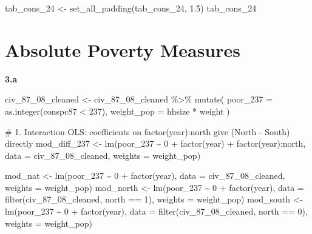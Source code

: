 \documentclass[
  letterpaper,
  DIV=11,
  numbers=noendperiod]{scrartcl}
\newenvironment{Shaded}{\begin{snugshade}}{\end{snugshade}}
\newcommand{\AttributeTok}[1]{\textcolor[rgb]{0.40,0.45,0.13}{#1}}
\newcommand{\CommentTok}[1]{\textcolor[rgb]{0.37,0.37,0.37}{#1}}
\newcommand{\DecValTok}[1]{\textcolor[rgb]{0.68,0.00,0.00}{#1}}
\newcommand{\FloatTok}[1]{\textcolor[rgb]{0.68,0.00,0.00}{#1}}
\newcommand{\FunctionTok}[1]{\textcolor[rgb]{0.28,0.35,0.67}{#1}}
\newcommand{\NormalTok}[1]{\textcolor[rgb]{0.00,0.23,0.31}{#1}}
\newcommand{\OtherTok}[1]{\textcolor[rgb]{0.00,0.23,0.31}{#1}}
\newcommand{\SpecialCharTok}[1]{\textcolor[rgb]{0.37,0.37,0.37}{#1}}
\begin{document}
\begin{Shaded}
\begin{Highlighting}[]
\NormalTok{tab\_cons\_24 }\OtherTok{\textless{}{-}} \FunctionTok{set\_all\_padding}\NormalTok{(tab\_cons\_24, }\FloatTok{1.5}\NormalTok{)}
\NormalTok{tab\_cons\_24}
\end{Highlighting}
\end{Shaded}

\section{Absolute Poverty Measures}\label{absolute-poverty-measures}

\textbf{3.a}

\begin{Shaded}
\begin{Highlighting}[]
\NormalTok{civ\_87\_08\_cleaned }\OtherTok{\textless{}{-}}\NormalTok{ civ\_87\_08\_cleaned }\SpecialCharTok{\%\textgreater{}\%}
  \FunctionTok{mutate}\NormalTok{(}
    \AttributeTok{poor\_237   =} \FunctionTok{as.integer}\NormalTok{(conspc87 }\SpecialCharTok{\textless{}} \DecValTok{237}\NormalTok{),}
    \AttributeTok{weight\_pop =}\NormalTok{ hhsize }\SpecialCharTok{*}\NormalTok{ weight}
\NormalTok{  )}

\CommentTok{\# 1. Interaction OLS: coefficients on factor(year):north give (North {-} South) directly}
\NormalTok{mod\_diff\_237 }\OtherTok{\textless{}{-}} \FunctionTok{lm}\NormalTok{(poor\_237 }\SpecialCharTok{\textasciitilde{}} \DecValTok{0} \SpecialCharTok{+} \FunctionTok{factor}\NormalTok{(year) }\SpecialCharTok{+} \FunctionTok{factor}\NormalTok{(year)}\SpecialCharTok{:}\NormalTok{north,}
                   \AttributeTok{data =}\NormalTok{ civ\_87\_08\_cleaned,}
                   \AttributeTok{weights =}\NormalTok{ weight\_pop)}

\NormalTok{mod\_nat   }\OtherTok{\textless{}{-}} \FunctionTok{lm}\NormalTok{(poor\_237 }\SpecialCharTok{\textasciitilde{}} \DecValTok{0} \SpecialCharTok{+} \FunctionTok{factor}\NormalTok{(year), }\AttributeTok{data =}\NormalTok{ civ\_87\_08\_cleaned, }\AttributeTok{weights =}\NormalTok{ weight\_pop)}
\NormalTok{mod\_north }\OtherTok{\textless{}{-}} \FunctionTok{lm}\NormalTok{(poor\_237 }\SpecialCharTok{\textasciitilde{}} \DecValTok{0} \SpecialCharTok{+} \FunctionTok{factor}\NormalTok{(year), }\AttributeTok{data =} \FunctionTok{filter}\NormalTok{(civ\_87\_08\_cleaned, north }\SpecialCharTok{==} \DecValTok{1}\NormalTok{), }\AttributeTok{weights =}\NormalTok{ weight\_pop)}
\NormalTok{mod\_south }\OtherTok{\textless{}{-}} \FunctionTok{lm}\NormalTok{(poor\_237 }\SpecialCharTok{\textasciitilde{}} \DecValTok{0} \SpecialCharTok{+} \FunctionTok{factor}\NormalTok{(year), }\AttributeTok{data =} \FunctionTok{filter}\NormalTok{(civ\_87\_08\_cleaned, north }\SpecialCharTok{==} \DecValTok{0}\NormalTok{), }\AttributeTok{weights =}\NormalTok{ weight\_pop)}


\end{Highlighting}
\end{Shaded}
\end{document}
